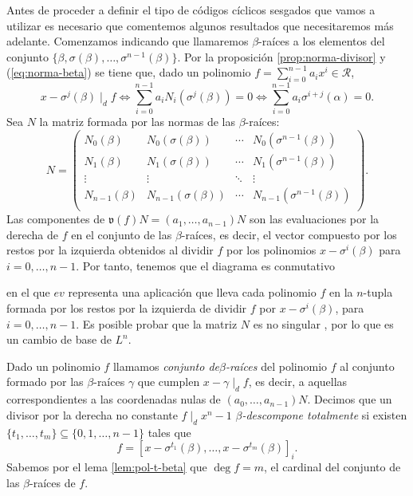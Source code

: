 Antes de proceder a definir el tipo de códigos cíclicos sesgados que vamos a utilizar es necesario que comentemos algunos resultados que necesitaremos más adelante.
Comenzamos indicando que llamaremos \(\beta\)-raíces a los elementos del conjunto \(\{\beta, \sigma(\beta), \dots, \sigma^{n-1}(\beta)\}\).
Por la proposición \ref{prop:norma-divisor} y (\ref{eq:norma-beta}) se tiene que, dado un polinomio \(f = \sum_{i=0}^{n-1}a_ix^i \in \mathcal R\),
\[
  x - \sigma^j(\beta) \mid_d f \iff \sum_{i=0}^{n-1}a_iN_i(\sigma^j(\beta)) = 0 \iff \sum_{i=0}^{n-1}a_i\sigma^{i+j}(\alpha) = 0.
\]
Sea \(N\) la matriz formada por las normas de las \(\beta\)-raíces:
\[
  N = \begin{pmatrix}
    N_0(\beta) & N_0(\sigma(\beta)) & \cdots & N_0(\sigma^{n-1}(\beta))\\
    N_1(\beta) & N_1(\sigma(\beta)) & \cdots & N_1(\sigma^{n-1}(\beta))\\
    \vdots & \vdots & \ddots & \vdots\\
    N_{n-1}(\beta) & N_{n-1}(\sigma(\beta)) & \cdots & N_{n-1}(\sigma^{n-1}(\beta))\\
  \end{pmatrix}.
\]
Las componentes de \(\mathfrak v(f)N = (a_1, \dots, a_{n-1})N\) son las evaluaciones por la derecha de \(f\) en el conjunto de las \(\beta\)-raíces, es decir, el vector compuesto por los restos por la izquierda obtenidos al dividir \(f\) por los polinomios \(x - \sigma^i(\beta)\) para \(i = 0, \dots, n - 1\).
Por tanto, tenemos que el diagrama es conmutativo
\begin{center}
\end{center}
en el que \(ev\) representa una aplicación que lleva cada polinomio \(f\) en la \(n\)-tupla formada por los restos por la izquierda de dividir \(f\) por \(x - \sigma^i(\beta)\), para \(i = 0, \dots, n - 1\).
Es posible probar que la matriz \(N\) es no singular \parencite[ver][Lema 2.1]{gomez-torrecillas_petersongorensteinzierler_2018}, por lo que es un cambio de base de \(L^n\).

Dado un polinomio \(f\) llamamos \emph{conjunto de}\(\beta\)\emph{-raíces} del polinomio \(f\) al conjunto formado por las \(\beta\)-raíces \(\gamma\) que cumplen \(x - \gamma \mid_d f\), es decir, a aquellas correspondientes a las coordenadas nulas de \((a_0, \dots, a_{n-1})N\).
Decimos que un divisor por la derecha no constante \(f \mid_d x^n - 1\) \(\beta\)\emph{-descompone totalmente} si existen \(\{t_1, \dots, t_m\} \subseteq \{0, 1, \dots, n-1\}\) tales que
\[
  f = \left[x - \sigma^{t_1}(\beta), \dots, x - \sigma^{t_m}(\beta)\right]_{i}.
\]
Sabemos por el lema \ref{lem:pol-t-beta} que \(\deg f = m\), el cardinal del conjunto de las \(\beta\)-raíces de \(f\).

